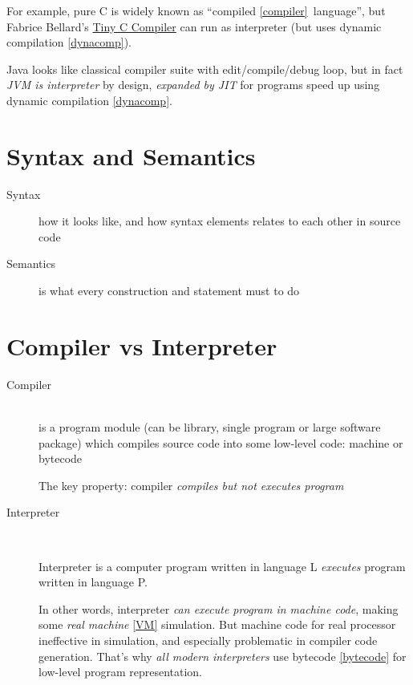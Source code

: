 For example, pure C is widely known as ``compiled \ref{compiler}\ language'',
but Fabrice Bellard's \href{http://bellard.org/tcc/}{Tiny C Compiler} can run
as interpreter (but uses dynamic compilation \ref{dynacomp}).

Java looks like classical compiler suite with edit/compile/debug
loop, but in fact \emph{JVM is interpreter} by design, \emph{expanded by JIT}
for programs speed up using dynamic compilation \ref{dynacomp}.

\section{Syntax and Semantics}

\begin{description}
\item[Syntax]\label{syntax} how it looks like, and how syntax elements relates
to each other in source code
\item[Semantics]\label{semantics} is what every construction and statement must
to do
\end{description}


\section{Compiler vs Interpreter}

\begin{description}
\item[Compiler]\ \\
is a program module (can be library, single program or large
software package) which compiles source code into some low-level code: machine
or bytecode

\setlength{\topsep}{0pt}
\begin{framed}
The key property: compiler \emph{compiles but not executes program}
\end{framed}
\item[Interpreter]\label{interpreter}\ \\
\begin{framed}
Interpreter is a computer program written in language L \emph{executes} program
written in language P.
\end{framed}

In other words, interpreter \emph{can execute program in machine code}, making
some \emph{real machine} \ref{VM} simulation. 
But machine code for real
processor ineffective in simulation, and especially problematic in compiler code generation. That's why
\emph{all modern interpreters} use bytecode \ref{bytecode} for low-level program
representation.
\end{description}

